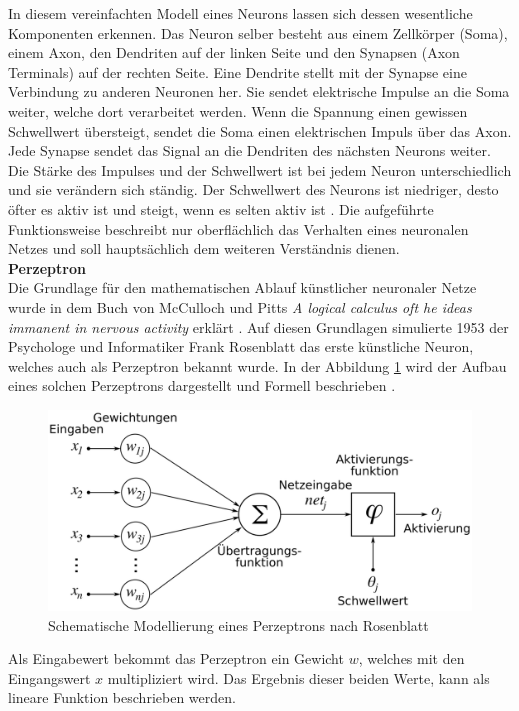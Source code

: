 In diesem vereinfachten Modell eines Neurons lassen sich dessen wesentliche Komponenten erkennen. Das Neuron selber besteht aus einem Zellkörper (Soma), einem Axon, den Dendriten auf der linken Seite und den Synapsen (Axon Terminals) auf der rechten Seite. Eine Dendrite stellt mit der Synapse eine Verbindung zu anderen Neuronen her. Sie sendet elektrische Impulse an die Soma weiter, welche dort verarbeitet werden. Wenn die Spannung einen gewissen Schwellwert übersteigt, sendet die Soma einen elektrischen Impuls über das Axon. Jede Synapse sendet das Signal an die Dendriten des nächsten Neurons weiter. Die Stärke des Impulses und der Schwellwert ist bei jedem Neuron unterschiedlich und sie verändern sich ständig. Der Schwellwert des Neurons ist niedriger, desto öfter es aktiv ist und steigt, wenn es selten aktiv ist \cite{schmidt2013physiologie}. Die aufgeführte Funktionsweise beschreibt nur oberflächlich das Verhalten eines neuronalen Netzes und soll hauptsächlich dem weiteren Verständnis dienen.\\
\textbf{Perzeptron}\\
Die Grundlage für den mathematischen Ablauf künstlicher neuronaler Netze wurde in dem Buch von McCulloch und Pitts \textit{A logical calculus oft he ideas immanent in nervous activity} erklärt \cite{McCulloch1943}. Auf diesen Grundlagen simulierte 1953 der Psychologe und Informatiker Frank Rosenblatt das erste künstliche Neuron, welches auch als Perzeptron bekannt wurde. In der Abbildung \ref{img:Perzeptron} wird der Aufbau eines solchen Perzeptrons dargestellt und Formell beschrieben \cite[269]{ertel2013grundkurs}.
\begin{figure}
	[h]
	\centering
	\includegraphics[scale=0.25]{Sources/perzeptron2.png}
	\caption{Schematische Modellierung eines Perzeptrons nach Rosenblatt \cite{perzeptron2019}}
	\label{img:Perzeptron}
\end{figure}
Als Eingabewert bekommt das Perzeptron ein Gewicht $w$, welches mit den Eingangswert $x$ multipliziert wird. Das Ergebnis dieser beiden Werte, kann als lineare Funktion beschrieben werden.
